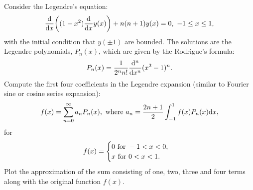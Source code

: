 \documentclass[12pt]{report}
\begin{document}
\newpage



\begin{problem}
    Consider the Legendre's equation:
    \[
        \frac{\mathrm{d} }{\mathrm{d} x} {\left((1-x^2)\frac{\mathrm{d} }{\mathrm{d} x}y(x)\right)} + n(n+1)y(x) = 0, ~ -1 \leq x \leq 1,
    \] 
    with the initial condition that $y(\pm1)$ are bounded. The solutions are the Legendre polynomials, $P_n(x)$, which are given by the Rodrigue's formula:
    \[
        P_n(x) = \frac{1}{2^n n!}\frac{\mathrm{d}^{n} }{\mathrm{d} x^{n}}(x^2 - 1)^n. 
    \]
    Compute the first four coefficients in the Legendre expansion (similar to Fourier sine or cosine series expansion):
    \[
        f(x) = \sum_{n=0}^{\infty} a_n P_n(x), ~\text{where}~ a_n = \frac{2n+1}{2}\int_{-1}^{1}f(x) P_n(x) {\mathrm{d}} x,
    \]
    for 
    \[
        f(x) = \begin{cases}
            0 {~\text{for}~} -1<x<0,\\
            x ~\text{for}~ 0<x<1.
        \end{cases}
    \]
    Plot the approximation of the sum consisting of one, two, three and four terms along with the original function $f(x)$. 




\end{problem}
\end{document}
